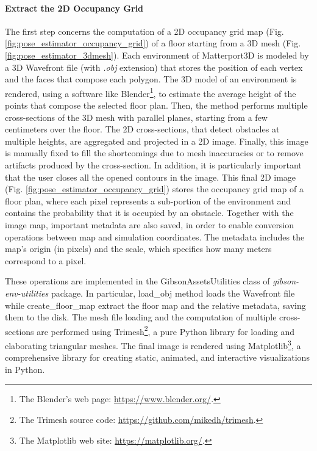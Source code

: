 \paragraph{Extract the 2D Occupancy Grid} The first step concerns the computation of a 2D occupancy grid map (Fig. \ref{fig:pose_estimator_occupancy_grid}) of a floor starting from a 3D mesh (Fig. \ref{fig:pose_estimator_3dmesh}). Each environment of Matterport3D is modeled by a 3D Wavefront file (with \textit{.obj} extension) that stores the position of each vertex and the faces that compose each polygon. The 3D model of an environment is rendered, using a software like Blender\footnote{The Blender's web page: \url{https://www.blender.org/}.}, to estimate the average height of the points that compose the selected floor plan. Then, the method performs multiple cross-sections of the 3D mesh with parallel planes, starting from a few centimeters over the floor. The 2D cross-sections, that detect obstacles at multiple heights, are aggregated and projected in a 2D image. Finally, this image is manually fixed to fill the shortcomings due to mesh inaccuracies or to remove artifacts produced by the cross-section. In addition, it is particularly important that the user closes all the opened contours in the image. This final 2D image (Fig. \ref{fig:pose_estimator_occupancy_grid}) stores the occupancy grid map of a floor plan, where each pixel represents a sub-portion of the environment and contains the probability that it is occupied by an obstacle. Together with the image map, important metadata are also saved, in order to enable conversion operations between map and simulation coordinates. The metadata includes the map's origin (in pixels) and the scale, which specifies how many meters correspond to a pixel.

These operations are implemented in the \textsf{GibsonAssetsUtilities} class of \textit{gibson-env-utilities} package. In particular, \textsf{load\_obj} method loads the Wavefront file while \textsf{create\_floor\_map} extract the floor map and the relative metadata, saving them to the disk. The mesh file loading and the computation of multiple cross-sections are performed using Trimesh\footnote{The Trimesh source code: \url{https://github.com/mikedh/trimesh}.}, a pure Python library for loading and elaborating triangular meshes. The final image is rendered using Matplotlib\footnote{The Matplotlib web site: \url{https://matplotlib.org/}.}, a comprehensive library for creating static, animated, and interactive visualizations in Python. 

